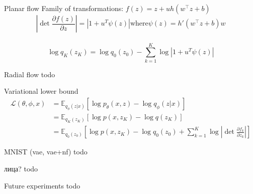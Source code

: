\documentclass[unicode,11pt]{beamer}
\begin{document}
\begin{frame}[fragile]{Planar flow}
Family of transformations: $f(z) = z + uh(w^⊤z + b)$\\
\vspace{5mm}
$$\left\vert \det \frac{\partial f(z)}{\partial z} \right\vert = \left\vert 1 + u^T \psi(z) \right\vert \text{where} \psi(z) = h'(w^⊤z + b)w$$ \\
$$\log q_K(z_K) = \log q_0(z_0) − \sum_{k=1}^K \log \left\vert 1 + u^T \psi(z) \right\vert $$
\end{frame}

\begin{frame}[fragile]{Radial flow}
todo

\end{frame}


\begin{frame}[fragile]{Variational lower bound}
\begin{align*} 
\mathcal{L}(\theta, \phi, x) &= \mathbb{E}_{q_\phi(z|x)} \left[ \log p_\theta(x, z) - \log q_\phi(z | x) \right] \\
&= \mathbb{E}_{q_K(z_K)} \left[ \log p(x, z_K) - \log q(z_K) \right] \\
&= \mathbb{E}_{q_0(z_0)} \left[ \log p(x, z_K) - \log q_0(z_0) + \sum_{k=1}^K \log \left\vert \det \frac{\partial f_k}{\partial z_k} \right\vert \right] 
\end{align*} 
\end{frame}


\begin{frame}[fragile]{MNIST (vae, vae+nf)}
todo
\end{frame}

\begin{frame}[fragile]{лица?}
todo
\end{frame}

\begin{frame}[fragile]{Future experiments}
todo 
\end{frame}
\end{document}
